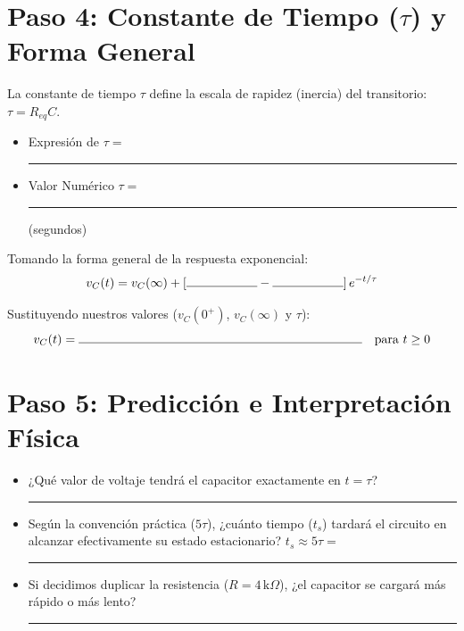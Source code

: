 \documentclass[11pt, a4paper]{article}
\begin{document}
\section*{Paso 4: Constante de Tiempo ($\tau$) y Forma General}
La constante de tiempo $\tau$ define la escala de rapidez (inercia) del transitorio: $\tau = R_{eq}C$.
\begin{itemize}
    \item Expresión de $\tau =$ \rule{4cm}{0.4pt}
    \item Valor Numérico $\tau =$ \rule{4cm}{0.4pt} (segundos)
\end{itemize}

Tomando la forma general de la respuesta exponencial:
$$v_C(t) = v_C(\infty) + \left[ \rule{2cm}{0.4pt} - \rule{2cm}{0.4pt} \right] e^{-t/\tau}$$

Sustituyendo nuestros valores ($v_C(0^+)$, $v_C(\infty)$ y $\tau$):
$$v_C(t) = \rule{8cm}{0.4pt} \quad \text{para } t \ge 0$$

\section*{Paso 5: Predicción e Interpretación Física}
\begin{itemize}
    \item ¿Qué valor de voltaje tendrá el capacitor exactamente en $t = \tau$? \rule{4cm}{0.4pt}
    \item Según la convención práctica ($5\tau$), ¿cuánto tiempo ($t_s$) tardará el circuito en alcanzar efectivamente su estado estacionario? $t_s \approx 5\tau = $ \rule{3cm}{0.4pt}
    \item Si decidimos duplicar la resistencia ($R=4\,\text{k}\Omega$), ¿el capacitor se cargará más rápido o más lento? \rule{4cm}{0.4pt}
\end{itemize}
\end{document}
